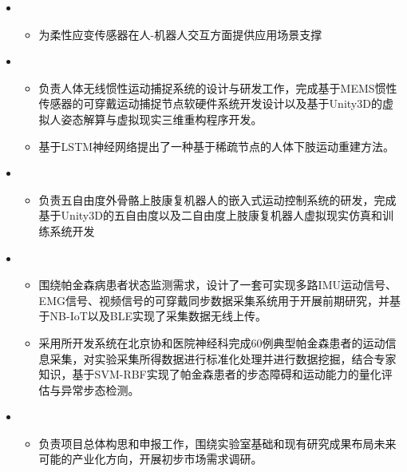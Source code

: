 \begin{itemize}[leftmargin=*]
    \item {}
    {\small
    \begin{itemize}
      \item 为柔性应变传感器在人-机器人交互方面提供应用场景支撑
    \end{itemize}
    }
    \item {}
    {\small
    \begin{itemize}
      \item 负责人体无线惯性运动捕捉系统的设计与研发工作，完成基于MEMS惯性传感器的可穿戴运动捕捉节点软硬件系统开发设计以及基于Unity3D的虚拟人姿态解算与虚拟现实三维重构程序开发。
      \item 基于LSTM神经网络提出了一种基于稀疏节点的人体下肢运动重建方法。
    \end{itemize}
    }
    \item {}
    {\small
    \begin{itemize}
      \item 负责五自由度外骨骼上肢康复机器人的嵌入式运动控制系统的研发，完成基于Unity3D的五自由度以及二自由度上肢康复机器人虚拟现实仿真和训练系统开发
    \end{itemize}
    }
    \item {}
    {\small
    \begin{itemize}
      \item 围绕帕金森病患者状态监测需求，设计了一套可实现多路IMU运动信号、EMG信号、视频信号的可穿戴同步数据采集系统用于开展前期研究，并基于NB-IoT以及BLE实现了采集数据无线上传。
      \item 采用所开发系统在北京协和医院神经科完成60例典型帕金森患者的运动信息采集，对实验采集所得数据进行标准化处理并进行数据挖掘，结合专家知识，基于SVM-RBF实现了帕金森患者的步态障碍和运动能力的量化评估与异常步态检测。
    \end{itemize}
    }
    \item {}
    {\small
    \begin{itemize}
      \item 负责项目总体构思和申报工作，围绕实验室基础和现有研究成果布局未来可能的产业化方向，开展初步市场需求调研。
    \end{itemize}
    }
  \end{itemize}